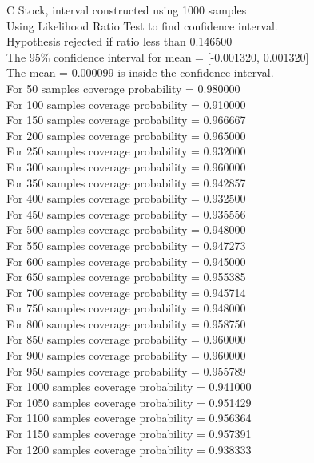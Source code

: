\documentclass{article}
\begin{document}
C Stock, interval constructed using 1000 samples\\
Using Likelihood Ratio Test to find confidence interval.\\
Hypothesis rejected if ratio less than 0.146500\\
The 95\% confidence interval for mean = [-0.001320, 0.001320]\\
The mean = 0.000099 is inside the confidence interval.\\
For 50 samples coverage probability = 0.980000\\
For 100 samples coverage probability = 0.910000\\
For 150 samples coverage probability = 0.966667\\
For 200 samples coverage probability = 0.965000\\
For 250 samples coverage probability = 0.932000\\
For 300 samples coverage probability = 0.960000\\
For 350 samples coverage probability = 0.942857\\
For 400 samples coverage probability = 0.932500\\
For 450 samples coverage probability = 0.935556\\
For 500 samples coverage probability = 0.948000\\
For 550 samples coverage probability = 0.947273\\
For 600 samples coverage probability = 0.945000\\
For 650 samples coverage probability = 0.955385\\
For 700 samples coverage probability = 0.945714\\
For 750 samples coverage probability = 0.948000\\
For 800 samples coverage probability = 0.958750\\
For 850 samples coverage probability = 0.960000\\
For 900 samples coverage probability = 0.960000\\
For 950 samples coverage probability = 0.955789\\
For 1000 samples coverage probability = 0.941000\\
For 1050 samples coverage probability = 0.951429\\
For 1100 samples coverage probability = 0.956364\\
For 1150 samples coverage probability = 0.957391\\
For 1200 samples coverage probability = 0.938333\\
\end{document}
